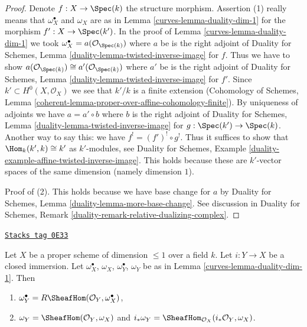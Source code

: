\begin{proof}

Denote $f : X \to \Spec(k)$ the structure morphism.
Assertion (1) really means that $\omega_X^\bullet$ and $\omega_X$
are as in Lemma \ref{curves-lemma-duality-dim-1} for the morphism
$f' : X \to \Spec(k')$. In the proof of Lemma \ref{curves-lemma-duality-dim-1}
we took $\omega_X^\bullet = a(\mathcal{O}_{\Spec(k)})$
where $a$ be is the right adjoint of
Duality for Schemes, Lemma
\ref{duality-lemma-twisted-inverse-image} for $f$.
Thus we have to show
$a(\mathcal{O}_{\Spec(k)}) \cong a'(\mathcal{O}_{\Spec(k)})$
where $a'$ be is the right adjoint of
Duality for Schemes, Lemma
\ref{duality-lemma-twisted-inverse-image} for $f'$.
Since $k' \subset H^0(X, \mathcal{O}_X)$ we see that $k'/k$ is a finite
extension (Cohomology of Schemes, Lemma
\ref{coherent-lemma-proper-over-affine-cohomology-finite}).
By uniqueness of adjoints we have $a = a' \circ b$ where
$b$ is the right adjoint of Duality for Schemes, Lemma
\ref{duality-lemma-twisted-inverse-image} for $g : \Spec(k') \to \Spec(k)$.
Another way to say this: we have $f^! = (f')^! \circ g^!$.
Thus it suffices to show that $\Hom_k(k', k) \cong k'$ as
$k'$-modules, see Duality for Schemes, Example
\ref{duality-example-affine-twisted-inverse-image}.
This holds because these are $k'$-vector spaces of
the same dimension (namely dimension $1$).

\medskip\noindent
Proof of (2). This holds because we have base change for $a$ by
Duality for Schemes, Lemma \ref{duality-lemma-more-base-change}.
See discussion in Duality for Schemes, Remark
\ref{duality-remark-relative-dualizing-complex}.
\end{proof}

\begin{lemma}
\label{curves-lemma-closed-immersion-dim-1-CM}
\href{https://stacks.math.columbia.edu/tag/0E33}{\texttt{Stacks tag 0E33}}

Let $X$ be a proper scheme of dimension $\leq 1$ over a field $k$.
Let $i : Y \to X$ be a closed immersion.
Let $\omega_X^\bullet$, $\omega_X$, $\omega_Y^\bullet$, $\omega_Y$
be as in Lemma \ref{curves-lemma-duality-dim-1}. Then
\begin{enumerate}
\item $\omega_Y^\bullet = R\SheafHom(\mathcal{O}_Y, \omega_X^\bullet)$,
\item $\omega_Y = \SheafHom(\mathcal{O}_Y, \omega_X)$ and
$i_*\omega_Y = \SheafHom_{\mathcal{O}_X}(i_*\mathcal{O}_Y, \omega_X)$.
\end{enumerate}
\end{lemma}

